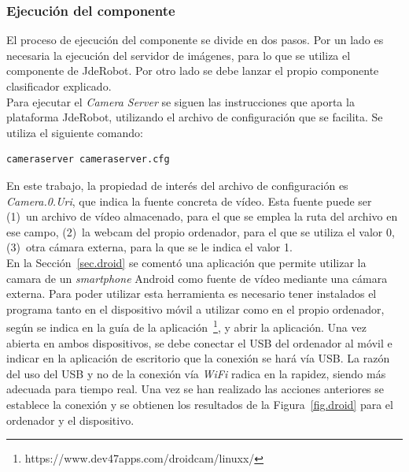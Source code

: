 \subsubsection{Ejecución del componente}
El proceso de ejecución del componente se divide en dos pasos. Por un lado es necesaria la ejecución del servidor de imágenes, para lo que se utiliza el componente de JdeRobot. Por otro lado se debe lanzar el propio componente clasificador explicado.\\

Para ejecutar el \textit{Camera Server} se siguen las instrucciones que aporta la plataforma JdeRobot, utilizando el archivo de configuración que se facilita. Se utiliza el siguiente comando: 
\vspace{10pt}
\begin{lstlisting}[frame=single]
	cameraserver cameraserver.cfg
\end{lstlisting}

En este trabajo, la propiedad de interés del archivo de configuración es \textit{Camera.0.Uri}, que indica la fuente concreta de vídeo. Esta fuente puede ser (1)~un archivo de vídeo almacenado, para el que se emplea la ruta del archivo en ese campo, (2)~la webcam del propio ordenador, para el que se utiliza el valor 0, (3)~otra cámara externa, para la que se le indica el valor 1.\\

En la Sección~\ref{sec.droid} se comentó una aplicación que permite utilizar la camara de un \textit{smartphone} Android como fuente de vídeo mediante una cámara externa. Para poder utilizar esta herramienta es necesario tener instalados el programa tanto en el dispositivo móvil a utilizar como en el propio ordenador, según se indica en la guía de la aplicación~\footnote{https://www.dev47apps.com/droidcam/linuxx/}, y abrir la aplicación. Una vez abierta en ambos dispositivos, se debe conectar el USB del ordenador al móvil e indicar en la aplicación de escritorio que la conexión se hará vía USB. La razón del uso del USB y no de la conexión vía \textit{WiFi} radica en la rapidez, siendo más adecuada para tiempo real. Una vez se han realizado las acciones anteriores se establece la conexión y se obtienen los resultados de la Figura~\ref{fig.droid} para el ordenador y el dispositivo.\\


